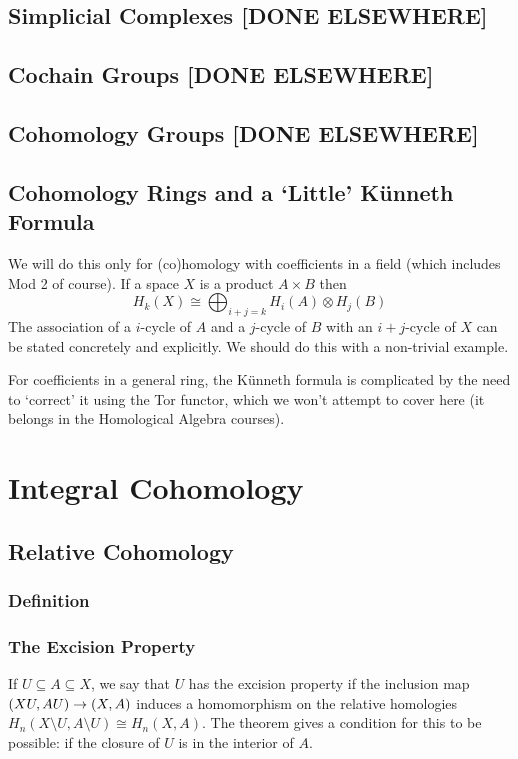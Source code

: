 \documentclass[oneside,english]{amsbook}
\numberwithin{section}{chapter}
\theoremstyle{plain}
\theoremstyle{definition}
\providecommand{\Kunneth}{K{\"u}nneth }
\begin{document}
	\section{Simplicial Complexes [DONE ELSEWHERE]}
	\section{Cochain Groups [DONE ELSEWHERE]}
	\section{Cohomology Groups [DONE ELSEWHERE]}
	\section{Cohomology Rings and a `Little' \Kunneth Formula}
	
	We will do this only for (co)homology with coefficients in a field (which includes Mod 2 of course). If a space $X$ is a product $A\times B$ then
	\[
		H_k (X) \cong \bigoplus_{i+j=k} H_i(A)\otimes H_j (B) 
 	\]
 	The association of a $i$-cycle of $A$ and a $j$-cycle of $B$ with an $i+j$-cycle of $X$ can be stated concretely and explicitly. We should do this with a non-trivial example.
 	
 	For coefficients in a general ring, the \Kunneth formula is complicated by the need to `correct' it using the Tor functor, which we won't attempt to cover here (it belongs in the Homological Algebra courses).

	\chapter{Integral Cohomology}
	\section{Relative Cohomology}
	
	\subsection{Definition}
	
	\subsection{The Excision Property}
	
	If $U\subseteq A\subseteq X$, we say that $U$ has the excision property if the inclusion map $(X\\ U, A\\ U)\to (X, A)$ induces a homomorphism on the relative homologies $H_{n}(X\setminus U,A\setminus U)\cong H_{n}(X,A)$. The theorem gives a condition for this to be possible: if the closure of $U$ is in the interior of $A$.
	
\end{document}
